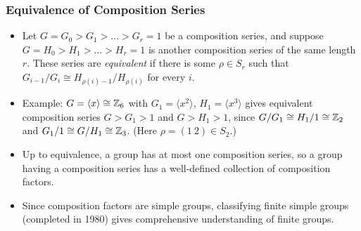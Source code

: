 \documentclass[../Odyssey_Project.tex]{subfiles}
\begin{document}
\subsubsection*{Equivalence of Composition Series}
\begin{itemize}
  \item Let $G = G_0 > G_1 > \ldots > G_r = 1$ be a composition series, and suppose $G = H_0 > H_1 > \ldots > H_r = 1$ is another composition series of the same length $r$. These series are \emph{equivalent} if there is some $\rho \in S_r$ such that $G_{i-1}/G_i \cong H_{\rho(i)-1}/H_{\rho(i)}$ for every $i$.
  \item Example: $G = \langle x \rangle \cong \mathbb{Z}_6$ with $G_1 = \langle x^2 \rangle$, $H_1 = \langle x^3 \rangle$ gives equivalent composition series $G > G_1 > 1$ and $G > H_1 > 1$, since $G/G_1 \cong H_1/1 \cong \mathbb{Z}_2$ and $G_1/1 \cong G/H_1 \cong \mathbb{Z}_3$. (Here $\rho = (1\ 2) \in S_2$.)
  \item Up to equivalence, a group has at most one composition series, so a group having a composition series has a well-defined collection of composition factors.
  \item Since composition factors are simple groups, classifying finite simple groups (completed in 1980) gives comprehensive understanding of finite groups.
\end{itemize}
\end{document}

